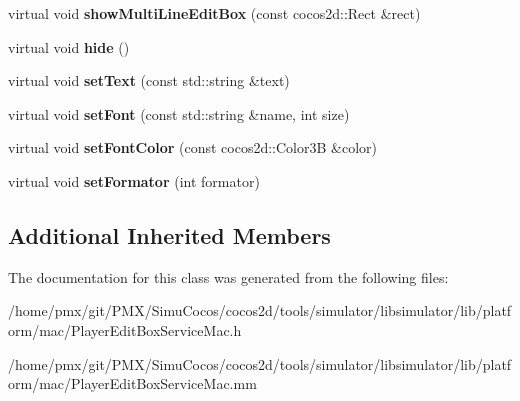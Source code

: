 \begin{DoxyCompactItemize}
virtual void {\bfseries show\+Multi\+Line\+Edit\+Box} (const cocos2d\+::\+Rect \&rect)
\item 
\mbox{\label{classPlayerEditBoxServiceMac_a8512ee77770dfbdf64f6f7572eb54614}} 
virtual void {\bfseries hide} ()
\item 
\mbox{\label{classPlayerEditBoxServiceMac_a11fd49a447d7168b30efe4274d973a34}} 
virtual void {\bfseries set\+Text} (const std\+::string \&text)
\item 
\mbox{\label{classPlayerEditBoxServiceMac_aeee2044be71675f3a57d29e9fba7bc0d}} 
virtual void {\bfseries set\+Font} (const std\+::string \&name, int size)
\item 
\mbox{\label{classPlayerEditBoxServiceMac_a6641cc1a2609367b969ba018469d7af6}} 
virtual void {\bfseries set\+Font\+Color} (const cocos2d\+::\+Color3B \&color)
\item 
\mbox{\label{classPlayerEditBoxServiceMac_adfbc698cc79c0953e8bb825807757bc1}} 
virtual void {\bfseries set\+Formator} (int formator)
\end{DoxyCompactItemize}
\subsection*{Additional Inherited Members}


The documentation for this class was generated from the following files\+:\begin{DoxyCompactItemize}
\item 
/home/pmx/git/\+P\+M\+X/\+Simu\+Cocos/cocos2d/tools/simulator/libsimulator/lib/platform/mac/Player\+Edit\+Box\+Service\+Mac.\+h\item 
/home/pmx/git/\+P\+M\+X/\+Simu\+Cocos/cocos2d/tools/simulator/libsimulator/lib/platform/mac/Player\+Edit\+Box\+Service\+Mac.\+mm\end{DoxyCompactItemize}
